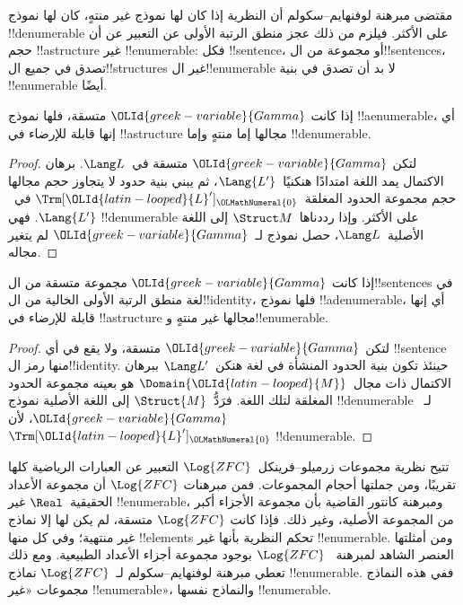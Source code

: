 \documentclass[../../../include/open-logic-section]{subfiles}
\begin{document}

مقتضى مبرهنة لوفنهايم--سكولم أن النظرية إذا كان لها نموذج غير منتهٍ،
كان لها نموذج !!{denumerable} على الأكثر. فيلزم من ذلك عجز منطق
الرتبة الأولى عن التعبير عن أن حجم !!a{structure} غير
!!{enumerable}: فكل !!{sentence}، أو مجموعة من ال!!{sentence}s،
تصدق في جميع ال!!{structure}s غير ال!!{enumerable} لا بد أن
تصدق في بنية !!{enumerable} أيضًا.

\begin{thm}
 إذا كانت $\OLId{greek-variable}{Gamma}$ متسقة، فلها نموذج
!!a{enumerable}، أي إنها قابلة للإرضاء في !!a{structure} مجالها إما
منتهٍ وإما !!{denumerable}.
\end{thm}

\begin{proof}
لتكن $\OLId{greek-variable}{Gamma}$ متسقة في~$\Lang L$. برهان الاكتمال يمد اللغة
امتدادًا هنكنيًا~$\Lang{L'}$، ثم يبني بنية حدود لا يتجاوز حجم
مجالها حجم مجموعة الحدود المغلقة~$\Trm[\OLId{latin-looped}{L}']_\OLMathNumeral{0}$ في~$\Lang{L'}$.
فهي !!{denumerable} على الأكثر. وإذا رددناها~$\Struct M$ إلى
اللغة الأصلية~$\Lang L$، حصل نموذج لـ~$\OLId{greek-variable}{Gamma}$ لم يتغير مجاله.
\end{proof}

\begin{thm}
 إذا كانت $\OLId{greek-variable}{Gamma}$ مجموعة متسقة من ال!!{sentence}s
في لغة منطق الرتبة الأولى الخالية من ال!!{identity}، فلها نموذج
!!a{denumerable}، أي إنها قابلة للإرضاء في !!a{structure} مجالها غير
منتهٍ و!!{enumerable}.
\end{thm}

\begin{proof}
لتكن $\OLId{greek-variable}{Gamma}$ متسقة، ولا يقع في أي !!{sentence} منها رمز
ال!!{identity}. حينئذ تكون بنية الحدود المنشأة في لغة
هنكن~$\Lang L'$ ببرهان الاكتمال ذات مجال~$\Domain{\OLId{latin-looped}{M}}$ هو بعينه
مجموعة الحدود المغلقة لتلك اللغة. فرَدُّ~$\Struct{M}$ إلى اللغة
الأصلية نموذج !!{denumerable} لـ~$\OLId{greek-variable}{Gamma}$، لأن
$\Trm[\OLId{latin-looped}{L}']_\OLMathNumeral{0}$ !!{denumerable}.
\end{proof}

\begin{ex}
تتيح نظرية مجموعات زرميلو--فرينكل~$\Log{ZFC}$ التعبير عن العبارات
الرياضية كلها تقريبًا، ومن جملتها أحجام المجموعات. فمن مبرهنات
$\Log{ZFC}$ أن مجموعة الأعداد الحقيقية~$\Real$ غير
!!{enumerable}، ومبرهنة كانتور القاضية بأن مجموعة الأجزاء أكبر من
المجموعة الأصلية، وغير ذلك. فإذا كانت $\Log{ZFC}$ متسقة، لم يكن
لها إلا نماذج غير منتهية؛ وفي كل منها !!{element}s تحكم النظرية
بأنها غير !!{enumerable}. ومن أمثلتها العنصر الشاهد لمبرهنة
~$\Log{ZFC}$ بوجود مجموعة أجزاء الأعداد الطبيعية. ومع ذلك تعطي
مبرهنة لوفنهايم--سكولم لـ~$\Log{ZFC}$ نماذج !!{enumerable}.
ففي هذه النماذج مجموعات «غير !!{enumerable}»، والنماذج نفسها
!!{enumerable}.
\end{ex}
\end{document}
